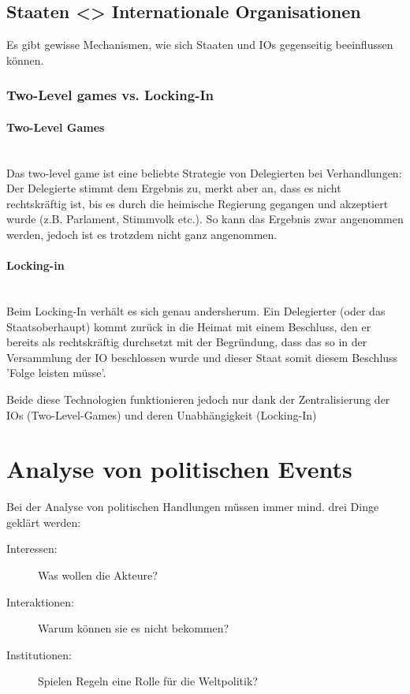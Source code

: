 \documentclass[a4paper, 11pt]{article}
\begin{document}
\subsection{Staaten <> Internationale Organisationen}

Es gibt gewisse Mechanismen, wie sich Staaten und IOs gegenseitig beeinflussen können.

\subsubsection{Two-Level games vs. Locking-In}

\paragraph{Two-Level Games} \mbox{}\\
Das two-level game ist eine beliebte Strategie von Delegierten bei Verhandlungen: Der Delegierte stimmt dem Ergebnis zu, merkt aber an, dass es nicht rechtskräftig ist, bis es durch die heimische Regierung gegangen und akzeptiert wurde (z.B. Parlament, Stimmvolk etc.). So kann das Ergebnis zwar angenommen werden, jedoch ist es trotzdem nicht ganz angenommen.

\paragraph{Locking-in} \mbox{}\\
Beim Locking-In verhält es sich genau andersherum. Ein Delegierter (oder das Staatsoberhaupt) kommt zurück in die Heimat mit einem Beschluss, den er bereits als rechtskräftig durchsetzt mit der Begründung, dass das so in der Versammlung der IO beschlossen wurde und dieser Staat somit diesem Beschluss 'Folge leisten müsse'.

\vspace{10px}

\noindent Beide diese Technologien funktionieren jedoch nur dank der Zentralisierung der IOs (Two-Level-Games) und deren Unabhängigkeit (Locking-In)

\section{Analyse von politischen Events}

Bei der Analyse von politischen Handlungen müssen immer mind. drei Dinge geklärt werden:

\begin{description}
	\item[Interessen: ] Was wollen die Akteure?
	\item[Interaktionen:] Warum können sie es nicht bekommen?
	\item[Institutionen: ] Spielen Regeln eine Rolle für die Weltpolitik?
\end{description}
\end{document}

